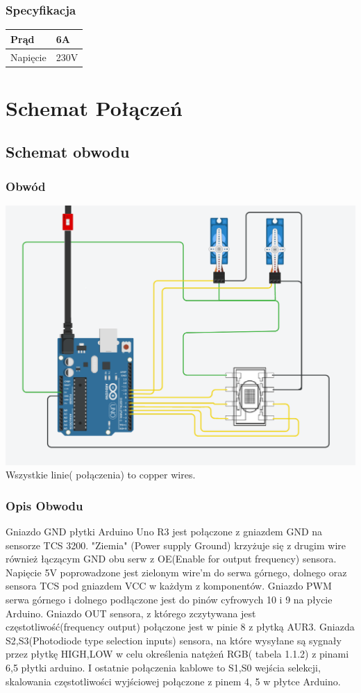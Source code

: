 \documentclass[12pt]{article}
\begin{document}
\subsubsection{Specyfikacja}
\begin{center}
\begin{tabular}{ | m{5cm} | m{3cm} | } 
\hline
Prąd& 6A \\
\hline
Napięcie& 230V\\
\hline
\end{tabular}
\end{center}
\section{Schemat Połączeń}
\subsection{Schemat obwodu}
\subsubsection{Obwód}
\hspace{-2.75cm}%
    \includegraphics[scale=0.5]{circuit_better.png}
Wszystkie linie( połączenia) to copper wires. 
\newpage
\subsubsection{Opis Obwodu}
Gniazdo GND płytki Arduino Uno R3 jest połączone z gniazdem GND na sensorze TCS 3200. "Ziemia" (Power supply Ground) krzyżuje się z drugim wire również łączącym GND obu serw z OE(Enable for output frequency) sensora. Napięcie 5V poprowadzone jest zielonym wire'm do serwa górnego, dolnego oraz sensora TCS pod gniazdem VCC w każdym z komponentów. Gniazdo PWM  serwa górnego i dolnego podłączone jest do pinów cyfrowych 10 i 9 na płycie Arduino. Gniazdo OUT sensora, z którego zczytywana jest częstotliwość(frequency output) połączone jest w pinie 8 z płytką AUR3. Gniazda S2,S3(Photodiode type selection inputs) sensora, na które wysyłane są sygnały przez płytkę HIGH,LOW w celu określenia natężeń RGB( tabela 1.1.2) z pinami 6,5 płytki arduino. I ostatnie połączenia kablowe to S1,S0 wejścia selekcji, skalowania częstotliwości wyjściowej połączone z pinem 4, 5 w płytce Arduino.
\end{document}
